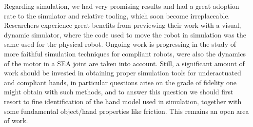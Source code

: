 \documentclass[%
	paper=A4,					%
	twoside=true,				%
	openright,			.
	parskip=full,				%
	chapterprefix=true,			%
	11pt,						%
	headings=normal,			%
	bibliography=totoc,			%
	listof=totoc,				%
	titlepage=on,				%
	captions=tableabove,		%
	draft=false,				%
]{scrreprt}%
\begin{document}
Regarding simulation, we had very promising results and had a great adoption rate to the simulator and relative tooling, which soon become irreplaceable. Researchers experience great benefits from previewing their work with a visual, dynamic simulator, where the code used to move the robot in simulation was the same used for the physical robot. Ongoing work is progressing in the study of  more faithful simulation techniques for compliant robots, were also the dynamics of the motor in a SEA joint are taken into account. Still, a significant amount of work should be invested in obtaining proper simulation tools for underactuated and compliant hands, in particular questions arise on the grade of fidelity one might obtain with such methods, and to answer this question we should first resort to fine identification of the hand model used in simulation, together with some fundamental object/hand properties like friction. This remains an open area of work.
\end{document}
